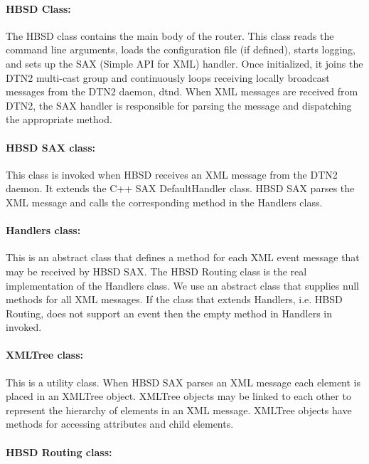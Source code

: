 \paragraph{HBSD Class:}

The HBSD class contains the main body of the router. This class reads the
command line arguments, loads the configuration file (if defined), starts
logging, and sets up the SAX (Simple API for XML) handler. Once initialized, it joins the DTN2 multi-cast group and continuously loops receiving locally broadcast messages from the DTN2 daemon, dtnd. When XML messages are received from DTN2, the SAX handler is responsible for parsing the message and dispatching the appropriate method.

\paragraph{HBSD SAX class:}

This class is invoked when HBSD receives an XML message from the DTN2 daemon. It extends the C++ SAX DefaultHandler class. HBSD SAX parses the XML message and calls the corresponding method in the Handlers class.

\paragraph{Handlers class:}

This is an abstract class that defines a method for each XML event message that may be received by HBSD SAX. The HBSD Routing class is the real implementation of the Handlers class. We use an abstract class that supplies null methods for all XML messages. If the class that extends Handlers, i.e. HBSD Routing, does not support an event then the empty method in Handlers in invoked.

\paragraph{XMLTree class:}

This is a utility class. When HBSD SAX parses an XML message each element is placed in an XMLTree object. XMLTree objects may be linked to each other to represent the hierarchy of elements in an XML message. XMLTree objects have methods for accessing attributes and child elements.

\paragraph{HBSD Routing class:}

